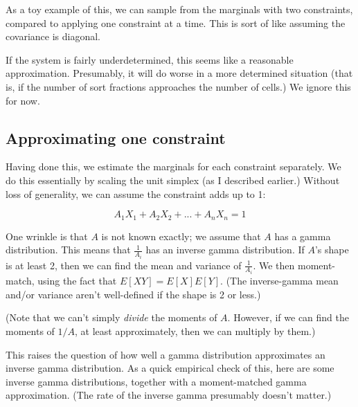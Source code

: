 \documentclass{article}\usepackage[]{graphicx}\usepackage[]{color}
\begin{document}
As a toy example of this, we can sample from the
marginals with two constraints, compared to applying
one constraint at a time. This is sort of like assuming
the covariance is diagonal.

If the system is fairly underdetermined, this seems like a
reasonable approximation. Presumably, it will do worse
in a more determined situation (that is, if the number
of sort fractions approaches the number of cells.) We
ignore this for now.

\subsection{Approximating one constraint}

Having done this, we estimate the marginals for each
constraint separately. We do this essentially by
scaling the unit simplex (as I described earlier.)
Without loss of generality, we can assume the constraint
adds up to 1:

\[
A_1 X_1 + A_2 X_2 + ... + A_n X_n = 1
\]

One wrinkle is that $A$ is not known exactly; we assume that
$A$ has a gamma distribution.
This means that $\frac{1}{A_i}$ has
an inverse gamma distribution. If $A$'s shape is at least
2, then we can find the mean and variance of $\frac{1}{A_i}$.
We then moment-match, using the fact that $E[XY] = E[X]E[Y]$.
(The inverse-gamma mean and/or variance aren't well-defined if the
shape is 2 or less.)

(Note that we can't simply {\em divide} the moments of $A$. However,
if we can find the moments of $1/A$, at least approximately, then
we can multiply by them.)

This raises the question of how well a gamma distribution
approximates an inverse gamma distribution. As a quick empirical check
of this, here are some inverse gamma distributions, together with a
moment-matched gamma approximation. (The rate of the inverse gamma presumably
doesn't matter.)
\end{document}
